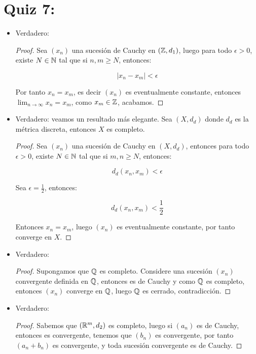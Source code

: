\section{Quiz 7:}

\begin{itemize}[label={✎},leftmargin=*]
    \item Verdadero:\\

    \begin{proof}
        Sea $(x_n)$ una sucesión de Cauchy en $(\mathbb{Z},d_1)$, luego para todo $\epsilon>0$, existe $N\in \mathbb{N}$ tal que si $n,m\geq N$, entonces:

        $$|x_n-x_m|<\epsilon$$

        Por tanto $x_n=x_m$, es decir $(x_n)$ es eventualmente constante, entonces $\lim_{n \to \infty} x_n=x_m$, como $x_m \in \mathbb{Z}$, acabamos.
    \end{proof}

    \item Verdadero: veamos un resultado más elegante. Sea $(X,d_d)$ donde $d_d$ es la métrica discreta, entonces $X$ es completo.\\

    \begin{proof}
        Sea $(x_n)$ una sucesión de Cauchy en $(X,d_d)$, entonces para todo $\epsilon>0$, existe $N\in\mathbb{N}$ tal que si $m,n\geq N$, entonces:

        $$d_d(x_n,x_m)<\epsilon$$

        Sea $\epsilon=\frac{1}{2}$, entonces:

        $$d_d(x_n,x_m)<\frac{1}{2}$$

        Entonces $x_n=x_m$, luego $(x_n)$ es eventualmente constante, por tanto converge en $X$.
    \end{proof}

    \item Verdadero:\\

    \begin{proof}
        Supongamos que $\mathbb{Q}$ es completo. Considere una sucesión $(x_n)$ convergente definida en $\mathbb{Q}$, entonces es de Cauchy y como $\mathbb{Q}$ es completo, entonces $(x_n)$ converge en $\mathbb{Q}$, luego $\mathbb{Q}$ es cerrado, contradicción.
    \end{proof} 

    \item Verdadero:\\ 

    \begin{proof}
        Sabemos que $(\mathbb{R}^m,d_2)$ es completo, luego si $(a_n)$ es de Cauchy, entonces es convergente, tenemos que $(b_n)$ es convergente, por tanto $(a_n+b_n)$ es convergente, y toda sucesión convergente es de Cauchy.
    \end{proof}


\end{itemize}
